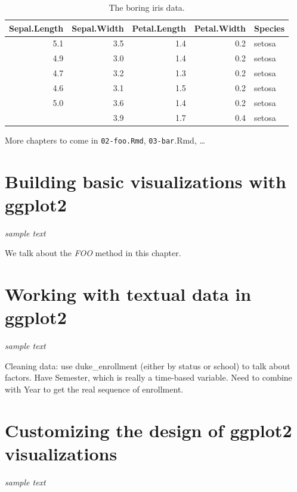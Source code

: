\documentclass[
]{krantz}
\begin{document}
\begin{table}

\caption{\label{tab:iris}The boring iris data.}
\centering
\begin{tabular}[t]{rrrrl}
\toprule
Sepal.Length & Sepal.Width & Petal.Length & Petal.Width & Species\\
\midrule
5.1 & 3.5 & 1.4 & 0.2 & setosa\\
4.9 & 3.0 & 1.4 & 0.2 & setosa\\
4.7 & 3.2 & 1.3 & 0.2 & setosa\\
4.6 & 3.1 & 1.5 & 0.2 & setosa\\
5.0 & 3.6 & 1.4 & 0.2 & setosa\\
\addlinespace
5.4 & 3.9 & 1.7 & 0.4 & setosa\\
\bottomrule
\end{tabular}
\end{table}

More chapters to come in \texttt{02-foo.Rmd}, \texttt{03-bar}.Rmd, \ldots{}

\hypertarget{building-basic-visualizations}{%
\chapter{Building basic visualizations with ggplot2}\label{building-basic-visualizations}}

\emph{sample text}

We talk about the \emph{FOO} method in this chapter.

\hypertarget{text-data-visualizations}{%
\chapter{Working with textual data in ggplot2}\label{text-data-visualizations}}

\emph{sample text}

Cleaning data: use duke\_enrollment (either by status or school) to talk about factors.
Have Semester, which is really a time-based variable. Need to combine with Year
to get the real sequence of enrollment.

\hypertarget{customizing-visualization-design}{%
\chapter{Customizing the design of ggplot2 visualizations}\label{customizing-visualization-design}}

\emph{sample text}
\end{document}
